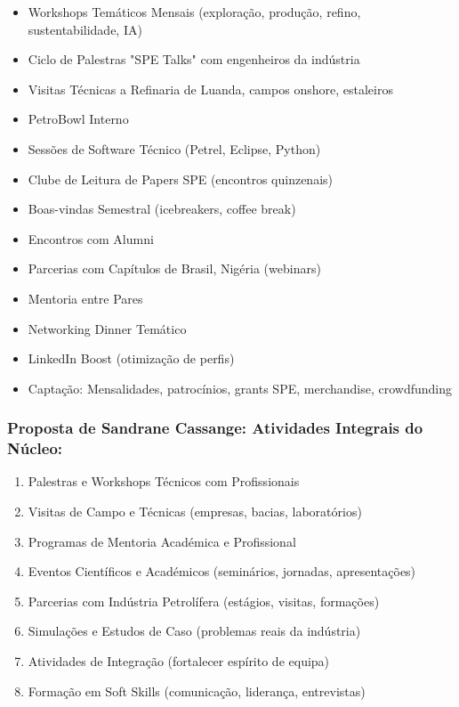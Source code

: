 \documentclass[12pt,a4paper]{article}
\begin{document}
\begin{itemize}[itemsep=0.15cm]
    \item Workshops Temáticos Mensais (exploração, produção, refino, sustentabilidade, IA)
    \item Ciclo de Palestras "SPE Talks" com engenheiros da indústria
    \item Visitas Técnicas a Refinaria de Luanda, campos onshore, estaleiros
    \item PetroBowl Interno
    \item Sessões de Software Técnico (Petrel, Eclipse, Python)
    \item Clube de Leitura de Papers SPE (encontros quinzenais)
    \item Boas-vindas Semestral (icebreakers, coffee break)
    \item Encontros com Alumni
    \item Parcerias com Capítulos de Brasil, Nigéria (webinars)
    \item Mentoria entre Pares
    \item Networking Dinner Temático
    \item LinkedIn Boost (otimização de perfis)
    \item Captação: Mensalidades, patrocínios, grants SPE, merchandise, crowdfunding
\end{itemize}

\subsubsection*{Proposta de Sandrane Cassange: Atividades Integrais do Núcleo:}

\begin{enumerate}[itemsep=0.1cm]
    \item Palestras e Workshops Técnicos com Profissionais
    \item Visitas de Campo e Técnicas (empresas, bacias, laboratórios)
    \item Programas de Mentoria Académica e Profissional
    \item Eventos Científicos e Académicos (seminários, jornadas, apresentações)
    \item Parcerias com Indústria Petrolífera (estágios, visitas, formações)
    \item Simulações e Estudos de Caso (problemas reais da indústria)
    \item Atividades de Integração (fortalecer espírito de equipa)
    \item Formação em Soft Skills (comunicação, liderança, entrevistas)
\end{enumerate}
\end{document}
